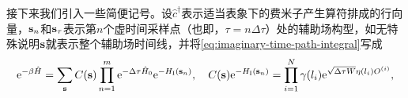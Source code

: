\documentclass[hyperref, UTF8, a4paper]{ctexart}
\newcommand*{\ee}{\mathrm{e}}
\begin{document}
接下来我们引入一些简便记号。设$\hat{c}^\dagger$表示适当表象下的费米子产生算符排成的行向量，$\vb{s}_n$和$\vb{s}_\tau$表示第$n$个虚时间采样点（也即，$\tau=n\Delta \tau$）处的辅助场构型，如无特殊说明$\vb{s}$就表示整个辅助场时间线，并将\eqref{eq:imaginary-time-path-integral}写成
\begin{equation}
    \ee^{-\beta \hat{H}} = \sum_{\vb{s}} C(\vb{s}) \prod_{n=1}^m \ee^{-\Delta \tau \hat{H}_0} \ee^{-H_\text{I}(\vb{s}_n)}, \quad C(\vb{s}) \ee^{-H_\text{I}(\vb{s}_n)} = \prod_{i=1}^N \gamma(l_i) \ee^{\sqrt{\Delta \tau W} \eta(l_i) O^{(i)}},
    \label{eq:o2-path-integral}
\end{equation}
\end{document}

